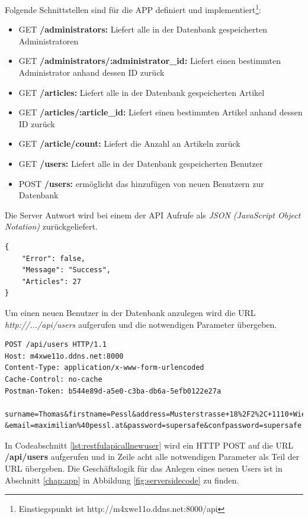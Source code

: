 	Folgende Schnittstellen sind für die APP definiert und implementiert\footnote{Einstiegspunkt ist http://m4xwe11o.ddns.net:8000/api}:
	\begin{itemize}
		\setlength\itemsep{0em}
		\item GET \textbf{/administrators:} Liefert alle in der Datenbank gespeicherten Administratoren
		\item GET \textbf{/administrators/:administrator\_id:} Liefert einen bestimmten Administrator anhand dessen ID zurück
		\item GET \textbf{/articles:} Liefert alle in der Datenbank gespeicherten Artikel
		\item GET \textbf{/articles/:article\_id:} Liefert einen bestimmten Artikel anhand dessen ID zurück
		\item GET \textbf{/article/count:} Liefert die Anzahl an Artikeln zurück
		\item GET \textbf{/users:} Liefert alle in der Datenbank gespeicherten Benutzer
		\item POST \textbf{/users:} ermöglicht das hinzufügen von neuen Benutzern zur Datenbank
	\end{itemize}

	Die Server Antwort wird bei einem der API Aufrufe als \textit{JSON (JavaScript Object Notation)} zurückgeliefert.
	\begin{lstlisting}[caption={Serverantwort - \textbf{/article/count:} API Call },label={lst:restfulapicallcount},captionpos=b,style=JAVA-Own]
{
    "Error": false,
    "Message": "Success",
    "Articles": 27
}
	\end{lstlisting}

	Um einen neuen Benutzer in der Datenbank anzulegen wird die URL \textit{http://.../api/users} aufgerufen und die notwendigen Parameter übergeben. 

	\begin{lstlisting}[caption={Anlegen eines neuen Benutzers durch URL Encoding},label={lst:restfulapicallnewuser},captionpos=b,style=JAVA-Own]
POST /api/users HTTP/1.1
Host: m4xwe11o.ddns.net:8000
Content-Type: application/x-www-form-urlencoded
Cache-Control: no-cache
Postman-Token: b544e89d-a5e0-c3ba-db6a-5efb0122e27a

surname=Thomas&firstname=Pessl&address=Musterstrasse+18%2F2%2C+1110+Wien
&email=maximilian%40pessl.at&password=supersafe&confpassword=supersafe
	\end{lstlisting}

	In Codeabschnitt \ref{lst:restfulapicallnewuser} wird ein HTTP POST auf die URL \textbf{/api/users} aufgerufen und in Zeile acht alle notwendigen Parameter als Teil der URL übergeben. Die Geschäftslogik für das Anlegen eines neuen Users ist in Abschnitt \ref{chap:app} in Abbildung \ref{fig:serversidecode} zu finden.













